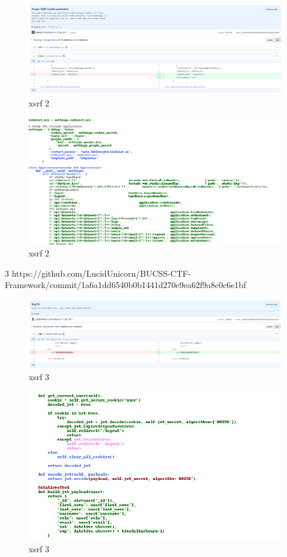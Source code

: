 \documentclass[
a4paper,
pagesize,
pdftex,
12pt,
twoside, %
BCOR=5mm, %
ngerman,
fleqn,
final,
]{scrartcl}
\begin{document}
\begin{figure}[h]
	\centering
	\includegraphics[width=\linewidth]{Images/xsrf2}
	\caption{xsrf 2}
	\label{fig:xsrf2}
\end{figure}
\begin{figure}[h]
	\centering
	\includegraphics[width=\linewidth]{Images/xsrf2r}
	\caption{xsrf 2}
	\label{fig:xsrf2r}
\end{figure}



3 https://github.com/LucidUnicorn/BUCSS-CTF-Framework/commit/1a6a1dd6540b0b1441d270e9ea62f9a8c0c6e1bf

\begin{figure}[h]
	\centering
	\includegraphics[width=\linewidth]{Images/xsrf3}
	\caption{xsrf 3}
	\label{fig:xsrf3}
\end{figure}
\begin{figure}[h]
	\centering
	\includegraphics[width=\linewidth]{Images/xsrf3r}
	\caption{xsrf 3}
	\label{fig:xsrf3r}
\end{figure}
\end{document}
